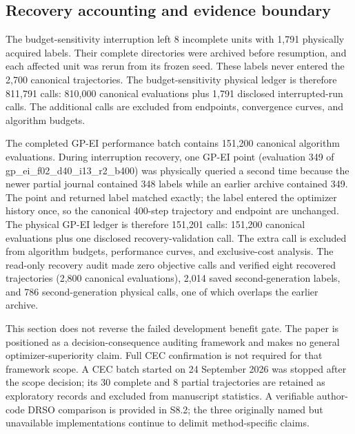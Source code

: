 \documentclass[suppldata]{interact}
\begin{document}
\hypertarget{recovery-accounting-and-evidence-boundary}{%
\subsection{Recovery accounting and evidence boundary}\label{recovery-accounting-and-evidence-boundary}}

The budget-sensitivity interruption left 8 incomplete units with 1,791 physically acquired labels. Their complete directories were archived before resumption, and each affected unit was rerun from its frozen seed. These labels never entered the 2,700 canonical trajectories. The budget-sensitivity physical ledger is therefore 811,791 calls: 810,000 canonical evaluations plus 1,791 disclosed interrupted-run calls. The additional calls are excluded from endpoints, convergence curves, and algorithm budgets.

The completed GP-EI performance batch contains 151,200 canonical algorithm evaluations. During interruption recovery, one GP-EI point (evaluation 349 of gp\_\allowbreak ei\_\allowbreak f02\_\allowbreak d40\_\allowbreak i13\_\allowbreak r2\_\allowbreak b400) was physically queried a second time because the newer partial journal contained 348 labels while an earlier archive contained 349. The point and returned label matched exactly; the label entered the optimizer history once, so the canonical 400-step trajectory and endpoint are unchanged. The physical GP-EI ledger is therefore 151,201 calls: 151,200 canonical evaluations plus one disclosed recovery-validation call. The extra call is excluded from algorithm budgets, performance curves, and exclusive-cost analysis. The read-only recovery audit made zero objective calls and verified eight recovered trajectories (2,800 canonical evaluations), 2,014 saved second-generation labels, and 786 second-generation physical calls, one of which overlaps the earlier archive.

This section does not reverse the failed development benefit gate. The paper is positioned as a decision-consequence auditing framework and makes no general optimizer-superiority claim. Full CEC confirmation is not required for that framework scope. A CEC batch started on 24 September 2026 was stopped after the scope decision; its 30 complete and 8 partial trajectories are retained as exploratory records and excluded from manuscript statistics. A verifiable author-code DRSO comparison is provided in S8.2; the three originally named but unavailable implementations continue to delimit method-specific claims.
\end{document}
